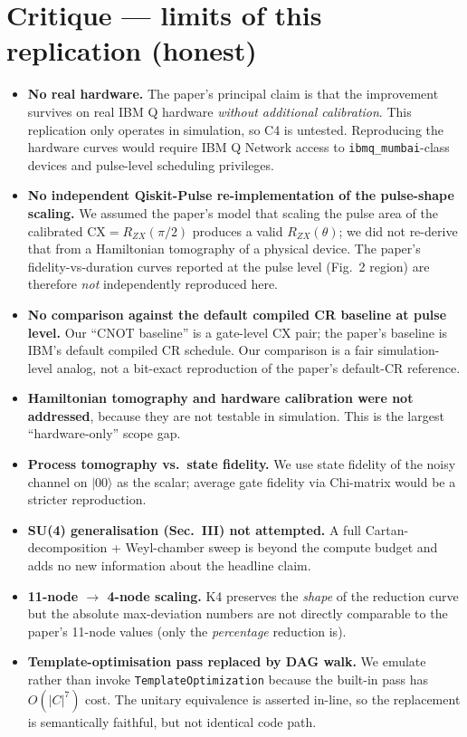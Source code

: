 \documentclass[11pt]{article}
\begin{document}
\section{Critique --- limits of this replication (honest)}
\begin{itemize}
  \item \textbf{No real hardware.} The paper's principal claim is that
  the improvement survives on real IBM Q hardware
  \emph{without additional calibration}. This replication only
  operates in simulation, so C4 is untested. Reproducing the
  hardware curves would require IBM Q Network access to
  \texttt{ibmq\_mumbai}-class devices and pulse-level scheduling
  privileges.
  \item \textbf{No independent Qiskit-Pulse re-implementation of the
  pulse-shape scaling.} We assumed the paper's model that
  scaling the pulse area of the calibrated $\mathrm{CX}=R_{ZX}(\pi/2)$
  produces a valid $R_{ZX}(\theta)$; we did not re-derive that
  from a Hamiltonian tomography of a physical device. The paper's
  fidelity-vs-duration curves reported at the pulse level (Fig.\ 2
  region) are therefore \emph{not} independently reproduced here.
  \item \textbf{No comparison against the default compiled CR
  baseline at pulse level.} Our ``CNOT baseline'' is a
  gate-level CX pair; the paper's baseline is IBM's default
  compiled CR schedule. Our comparison is a fair simulation-level
  analog, not a bit-exact reproduction of the paper's default-CR
  reference.
  \item \textbf{Hamiltonian tomography and hardware calibration were
  not addressed}, because they are not testable in simulation.
  This is the largest ``hardware-only'' scope gap.
  \item \textbf{Process tomography vs.\ state fidelity.} We use state
  fidelity of the noisy channel on $|00\rangle$ as the scalar;
  average gate fidelity via Chi-matrix would be a stricter reproduction.
  \item \textbf{SU(4) generalisation (Sec.\ III) not attempted.} A
  full Cartan-decomposition + Weyl-chamber sweep is beyond the
  compute budget and adds no new information about the headline claim.
  \item \textbf{11-node $\to$ 4-node scaling.} K4 preserves the
  \emph{shape} of the reduction curve but the absolute
  max-deviation numbers are not directly comparable to the
  paper's 11-node values (only the \emph{percentage} reduction
  is).
  \item \textbf{Template-optimisation pass replaced by DAG walk.} We
  emulate rather than invoke \texttt{TemplateOptimization} because
  the built-in pass has $O(|C|^7)$ cost. The unitary equivalence
  is asserted in-line, so the replacement is semantically
  faithful, but not identical code path.
\end{itemize}
\end{document}
